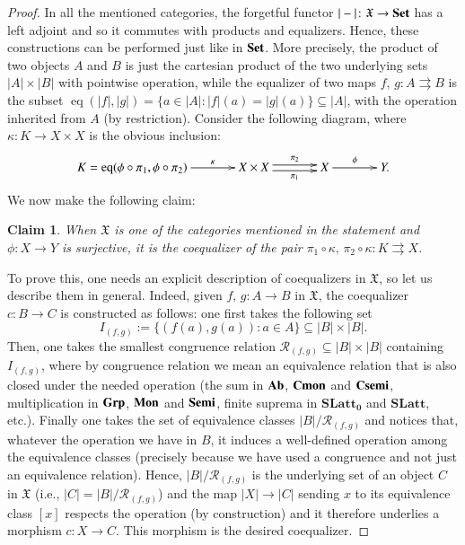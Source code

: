 \documentclass[12pt]{article}
\newtheorem{claim}[lemma]{Claim}
\theoremstyle{definition}
\def\X{\mathfrak X}
\newcommand{\Set}{\textbf{\textup{Set}}}
\newcommand{\Ab}{\textbf{\textup{Ab}}}
\newcommand{\Grp}{\textbf{\textup{Grp}}}
\newcommand{\Mon}{\textbf{\textup{Mon}}}
\newcommand{\Cmon}{\textbf{\textup{Cmon}}}
\newcommand{\Semi}{\textbf{\textup{Semi}}}
\newcommand{\Csemi}{\textbf{\textup{Csemi}}}
\newcommand{\SLatt}{\mathbf{SLatt_0}}
\newcommand{\SLattnobottom}{\mathbf{SLatt}}
\DeclareMathOperator{\eq}{eq}
\numberwithin{equation}{section}
\begin{document}
\begin{proof}
In all the mentioned categories, the forgetful functor $|-|\colon \X\to \Set$ has a left adjoint and so it commutes with products and equalizers. Hence, these constructions can be performed just like in $\Set$. More precisely, the product of two objects $A$ and $B$ is just the cartesian product of the two underlying sets $|A|\times |B|$ with pointwise operation, while the equalizer of two  maps $f,\,g\colon A\rightrightarrows B$ is  the subset $\eq(|f|,|g|)=\{a\in |A|:|f|(a)=|g|(a)\}\subseteq |A|$, with the operation inherited from $A$ (by restriction). Consider the following diagram, where $\kappa\colon K\to X\times X$ is the obvious inclusion:
\[
\xymatrix@C=35pt{
K=\eq(\phi\circ\pi_1,\phi\circ\pi_2)\ar[r]^-\kappa& X\times X \ar@<-.5ex>[r]_-{\pi_1} \ar@<.5ex>[r]^-{\pi_2} &X\ar[r]^{\phi}&Y.
}
\]
We now make the following claim:
\begin{claim}\label{claim_inside_prop_fact_in_alg}
When $\X$ is one of the categories mentioned in the statement and $\phi\colon X\to Y$ is surjective, it is the coequalizer of the pair $\pi_1\circ\kappa,\, \pi_2\circ \kappa\colon K\rightrightarrows X$. 
\end{claim}
To prove this, one needs an explicit description of coequalizers in $\X$, so let us describe them in general. Indeed, given $f,\, g\colon A\to B$ in $\X$, the coequalizer $c\colon B\to C$ is constructed as follows: one first takes the following set 
\[
I_{(f,g)}:=\{(f(a),g(a)):a\in A\}\subseteq |B|\times |B|.
\]
Then, one takes the smallest congruence relation $\mathcal R_{(f,g)}\subseteq  |B|\times |B|$ containing $I_{(f,g)}$, where by congruence relation we mean an equivalence relation that is also closed under the needed operation (the sum in $\Ab$, $\Cmon$ and $\Csemi$, multiplication in $\Grp$, $\Mon$ and $\Semi$, finite suprema in $\SLatt$ and $\SLattnobottom$, etc.). Finally one takes the set of equivalence classes $|B|/\mathcal R_{(f,g)}$ and notices that, whatever the operation we have in $B$, it induces a well-defined operation among the equivalence classes (precisely because we have used a congruence and not just an equivalence relation). Hence, $|B|/\mathcal R_{(f,g)}$ is the underlying set of an object $C$ in $\X$ (i.e., $|C|=|B|/\mathcal R_{(f,g)}$) and the map $|X|\to |C|$ sending $x$ to its equivalence class $[x]$ respects the operation (by construction) and it therefore underlies a morphism $c\colon X\to C$. This morphism is the desired coequalizer. 


\end{proof}
\end{document}
